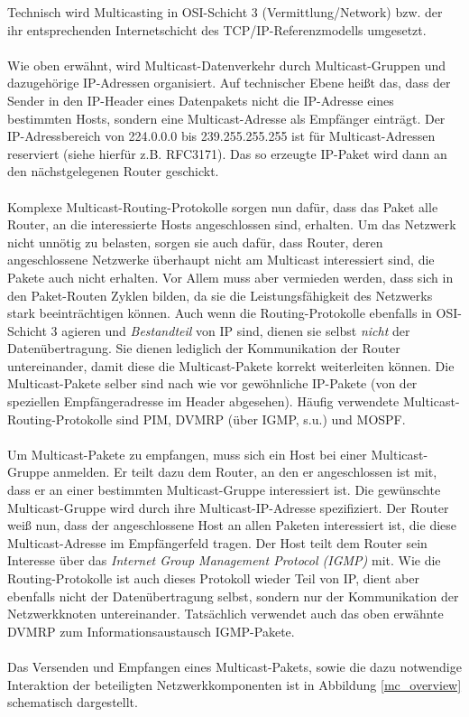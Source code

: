 Technisch wird Multicasting in OSI-Schicht 3 (Vermittlung/Network) bzw. der ihr
entsprechenden Internetschicht des TCP/IP-Referenzmodells umgesetzt.\\
\\
Wie oben erwähnt, wird Multicast-Datenverkehr durch Multicast-Gruppen und
dazugehörige IP-Adressen organisiert. Auf technischer Ebene heißt das, dass der
Sender in den IP-Header eines Datenpakets nicht die IP-Adresse eines bestimmten
Hosts, sondern eine Multicast-Adresse als Empfänger einträgt. Der
IP-Adressbereich von 224.0.0.0 bis 239.255.255.255 ist für
Multicast-Adressen reserviert (siehe hierfür z.B. RFC3171). Das so erzeugte
IP-Paket wird dann an den nächstgelegenen Router geschickt.\\
\\
Komplexe Multicast-Routing-Protokolle sorgen nun dafür, dass das Paket alle
Router, an die interessierte Hosts angeschlossen sind, erhalten. Um das Netzwerk
nicht unnötig zu belasten, sorgen sie auch dafür, dass Router, deren
angeschlossene Netzwerke überhaupt nicht am Multicast interessiert sind, die
Pakete auch nicht erhalten. Vor Allem muss aber vermieden werden, dass sich in
den Paket-Routen Zyklen bilden, da sie die Leistungsfähigkeit des Netzwerks
stark beeinträchtigen können. Auch wenn die Routing-Protokolle ebenfalls in
OSI-Schicht 3 agieren und \emph{Bestandteil} von IP sind, dienen sie selbst
\emph{nicht} der Datenübertragung. Sie dienen lediglich der Kommunikation der
Router untereinander, damit diese die Multicast-Pakete korrekt weiterleiten
können. Die Multicast-Pakete selber sind nach wie vor gewöhnliche IP-Pakete
(von der speziellen Empfängeradresse im Header abgesehen). Häufig verwendete
Multicast-Routing-Protokolle sind PIM, DVMRP (über IGMP, s.u.) und MOSPF.\\
\\
Um Multicast-Pakete zu empfangen, muss sich ein Host bei einer Multicast-Gruppe
anmelden. Er teilt dazu dem Router, an den er angeschlossen ist mit, dass er an
einer bestimmten Multicast-Gruppe interessiert ist. Die gewünschte
Multicast-Gruppe wird durch ihre Multicast-IP-Adresse spezifiziert. Der Router
weiß nun, dass der angeschlossene Host an allen Paketen interessiert ist, die
diese Multicast-Adresse im Empfängerfeld tragen. Der Host teilt dem Router sein
Interesse über das \emph{Internet Group Management Protocol (IGMP)} mit. Wie
die Routing-Protokolle ist auch dieses Protokoll wieder Teil von IP, dient aber
ebenfalls nicht der Datenübertragung selbst, sondern nur der Kommunikation der Netzwerkknoten
untereinander. Tatsächlich verwendet auch das oben erwähnte DVMRP zum
Informationsaustausch IGMP-Pakete.\\
\\
Das Versenden und Empfangen eines Multicast-Pakets, sowie die dazu
notwendige Interaktion der beteiligten Netzwerkkomponenten ist in Abbildung
\ref{mc_overview} schematisch dargestellt.

